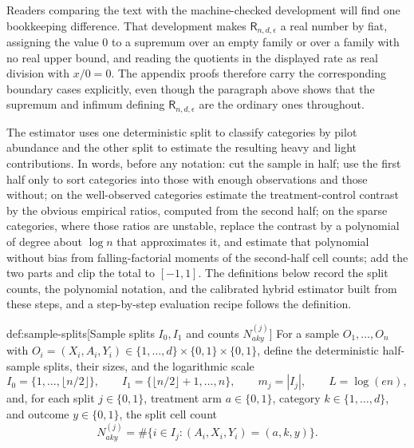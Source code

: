 Readers comparing the text with the machine-checked development will find one bookkeeping difference. That development makes \(\mathsf R_{n,d,\epsilon}\) a real number by fiat, assigning the value \(0\) to a supremum over an empty family or over a family with no real upper bound, and reading the quotients in the displayed rate as real division with \(x/0=0\). The appendix proofs therefore carry the corresponding boundary cases explicitly, even though the paragraph above shows that the supremum and infimum defining \(\mathsf R_{n,d,\epsilon}\) are the ordinary ones throughout.

The estimator uses one deterministic split to classify categories by pilot abundance and the other split to estimate the resulting heavy and light contributions. In words, before any notation: cut the sample in half; use the first half only to sort categories into those with enough observations and those without; on the well-observed categories estimate the treatment-control contrast by the obvious empirical ratios, computed from the second half; on the sparse categories, where those ratios are unstable, replace the contrast by a polynomial of degree about \(\log n\) that approximates it, and estimate that polynomial without bias from falling-factorial moments of the second-half cell counts; add the two parts and clip the total to \([-1,1]\). The definitions below record the split counts, the polynomial notation, and the calibrated hybrid estimator built from these steps, and a step-by-step evaluation recipe follows the definition.

\begin{definitionv}{def:sample-splits}[Sample splits \(I_0,I_1\) and counts \(N^{(j)}_{aky}\)]
For a sample \(O_1,\ldots,O_n\) with \(O_i=(X_i,A_i,Y_i)\in\{1,\ldots,d\}\times\{0,1\}\times\{0,1\}\), define the deterministic half-sample splits, their sizes, and the logarithmic scale
\[
I_0=\{1,\ldots,\lfloor n/2\rfloor\},\qquad I_1=\{\lfloor n/2\rfloor+1,\ldots,n\},\qquad m_j=|I_j|,\qquad L=\log(en),
\]
and, for each split \(j\in\{0,1\}\), treatment arm \(a\in\{0,1\}\), category \(k\in\{1,\ldots,d\}\), and outcome \(y\in\{0,1\}\), the split cell count
\[
N^{(j)}_{aky}=\#\{i\in I_j:(A_i,X_i,Y_i)=(a,k,y)\}.
\]
\end{definitionv}

